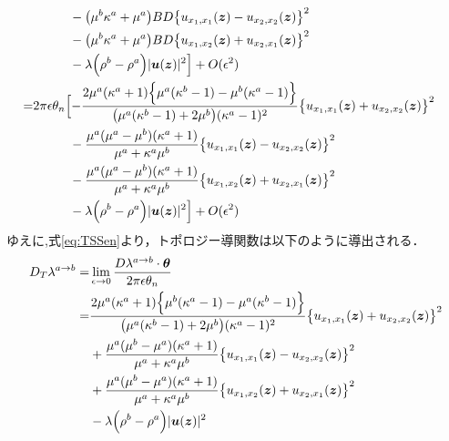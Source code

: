 \begin{align}
		\nonumber
		\\
	&\hspace{1cm}-\bigl(\mu^{b}\kappa^{a}+\mu^{a}\bigr)BD
		\bigl\{u_{x_{1},x_{1}}(\bm{z})-u_{x_{2},x_{2}}(\bm{z})\bigr\}^2
		\nonumber
		\\
	&\hspace{1cm}-\bigl(\mu^{b}\kappa^{a}+\mu^{a}\bigr)BD
		\bigl\{u_{x_{1},x_{2}}(\bm{z})+u_{x_{2},x_{1}}(\bm{z})\bigr\}^2
		\nonumber
		\\
	&\hspace{1cm}-\lambda\Bigr(\rho^{b}-\rho^{a}\Bigl)|\bm{u}(\bm{z})|^{2}
	\Bigr]+O(\epsilon^2)
	\nonumber
	\\
	=&2\pi\epsilon\theta_{n}\Bigl[
	-\frac{2\mu^{a}(\kappa^{a}+1)\Bigl\{\mu^{a}(\kappa^{b}-1)-\mu^{b}(\kappa^{a}-1)\Bigl\}}
			{\bigl(\mu^{a}(\kappa^{b}-1)+2\mu^{b}\bigr)(\kappa^{a}-1)^2}
		\bigl\{u_{x_{1},x_{1}}(\bm{z})+u_{x_{2},x_{2}}(\bm{z})\bigr\}^2
		\nonumber
		\\
	&\hspace{1cm}-\frac{\mu^{a}(\mu^{a}-\mu^{b})(\kappa^{a}+1)}{\mu^{a}+\kappa^{a}\mu^{b}}
		\bigl\{u_{x_{1},x_{1}}(\bm{z})-u_{x_{2},x_{2}}(\bm{z})\bigr\}^2
		\nonumber
		\\
	&\hspace{1cm}-\frac{\mu^{a}(\mu^{a}-\mu^{b})(\kappa^{a}+1)}{\mu^{a}+\kappa^{a}\mu^{b}}
		\bigl\{u_{x_{1},x_{2}}(\bm{z})+u_{x_{2},x_{1}}(\bm{z})\bigr\}^2
		\nonumber
		\\
	&\hspace{1cm}-\lambda\Bigr(\rho^{b}-\rho^{a}\Bigl)|\bm{u}(\bm{z})|^{2}
	\Bigr]+O(\epsilon^2)
	\label{eq:SDForTDRTh}
\end{align}
ゆえに,式\eqref{eq:TSSen}より，トポロジー導関数は以下のように導出される．
\begin{align}
	D_{T}\lambda^{a\rightarrow b}=&\lim_{\epsilon \to 0} \frac{D\lambda^{a\rightarrow b}\cdot\bm{\theta}}{2\pi\epsilon\theta_{n}}
	\nonumber
	\\
	=&\frac{2\mu^{a}(\kappa^{a}+1)\Bigl\{\mu^{b}(\kappa^{a}-1)-\mu^{a}(\kappa^{b}-1)\Bigl\}}
			{\bigl(\mu^{a}(\kappa^{b}-1)+2\mu^{b}\bigr)(\kappa^{a}-1)^2}
		\bigl\{u_{x_{1},x_{1}}(\bm{z})+u_{x_{2},x_{2}}(\bm{z})\bigr\}^2
		\nonumber
		\\
	&+\frac{\mu^{a}(\mu^{b}-\mu^{a})(\kappa^{a}+1)}{\mu^{a}+\kappa^{a}\mu^{b}}
		\bigl\{u_{x_{1},x_{1}}(\bm{z})-u_{x_{2},x_{2}}(\bm{z})\bigr\}^2
		\nonumber
		\\
	&+\frac{\mu^{a}(\mu^{b}-\mu^{a})(\kappa^{a}+1)}{\mu^{a}+\kappa^{a}\mu^{b}}
		\bigl\{u_{x_{1},x_{2}}(\bm{z})+u_{x_{2},x_{1}}(\bm{z})\bigr\}^2
		\nonumber
		\\
	&-\lambda\Bigr(\rho^{b}-\rho^{a}\Bigl)|\bm{u}(\bm{z})|^{2}
	\label{eq:TD}
\end{align}
